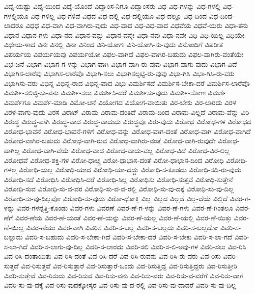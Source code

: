 {ವಿದ್ಯೆ-ಯಷ್ಟು
ವಿದ್ಯೆ-ಯಿಂದ
ವಿದ್ಯೆ-ಯೊಂದೆ
ವಿದ್ವಾಂಸ-ನಿಗೂ
ವಿದ್ವಾಂಸರು
ವಿಧ
ವಿಧ-ಗಳನ್ನು
ವಿಧ-ಗಳಲ್ಲಿ
ವಿಧ-ಗಳಲ್ಲಿಯೂ
ವಿಧ-ಗಳಿಲ್ಲ
ವಿಧ-ಗಳಿವೆ
ವಿಧದ
ವಿಧ-ದಲ್ಲಿ
ವಿಧ-ದಲ್ಲಿಯೂ
ವಿಧ-ದಲ್ಲೂ
ವಿಧ-ದಿಂದ
ವಿಧ-ದಿಂದ-ಲಾದರೂ
ವಿಧಧ
ವಿಧ-ವಾಗಿ
ವಿಧ-ವಾಗಿರು-ವುದು
ವಿಧ-ವಾದ
ವಿಧ-ವಿಧ-ವಾದ
ವಿಧವೆಯ
ವಿಧವೆ-ಯರು
ವಿಧಾ-ತನು
ವಿಧಾನ
ವಿಧಾನ-ಗಳು
ವಿಧಾ-ನದ
ವಿಧಾನ-ವನ್ನು
ವಿಧಾನ-ವನ್ನೇ
ವಿಧಾ-ನವು
ವಿಧಾ-ನವೇ
ವಿಧಿ
ವಿಧಿ-ಯಿಲ್ಲ
ವಿಧಿಯೇ
ವಿಧೇಯ-ಳಾದ
ವಿನಃ
ವಿನಲ್ಲಿ
ವಿನಾ
ವಿನಿಂದ
ವಿನಿ-ಯೋಗಃ
ವಿನಿ-ಯೋಗಿ-ಸು-ವುದು
ವಿನೊಂದಿಗೆ
ವಿಪರೀತ
ವಿಪರ್ಯಯ
ವಿಪರ್ಯಯವು
ವಿಪರ್ಯಯೋ
ವಿಫಲ-ವಾಗಿದೆ
ವಿಫಲ-ವಾಗಿರ-ಬಹುದು
ವಿಫಲ-ವಾಗಿರು-ವಂತೆಯೇ
ವಿಭ-ಜನೆ
ವಿಭಾಗ
ವಿಭಾಗ-ಗ-ಳನ್ನು
ವಿಭಾಗ-ವಾಗಿ
ವಿಭಾಗ-ವಾಗಿ-ರು-ವುವು
ವಿಭಾಗ-ವಾಗು-ವುದು
ವಿಭಾಗ-ವಿದೆ
ವಿಭಾಗಿಸ-ಲಾರೆವು
ವಿಭಾಗಿಸ-ಲಾರೆವೊ
ವಿಭಾಗಿ-ಸಲು
ವಿಭಾಗಿಸಲ್ಪಟ್ಟಿ-ರು-ವುವು
ವಿಭಾ-ಗಿಸಿ
ವಿಭಾ-ಗಿಸಿ-ರು-ವರು
ವಿಭಾಗಿಸು-ವರು
ವಿಭಿನ್ನ
ವಿಭಿನ್ನ-ರಾದ
ವಿಭಿನ್ನ-ವಾದ
ವಿಭು
ವಿಮರ್ಶಿಸದೆ
ವಿಮರ್ಶಿಸ-ಬೇಕಾ-ದರೆ
ವಿಮರ್ಶಿಸ-ಲಾರೆವೊ
ವಿಮರ್ಶಿ-ಸಲಿಚ್ಛಿ-ಸು-ವನು
ವಿಮರ್ಶಿ-ಸಲು
ವಿಮರ್ಶಿಸಿ-ದರೆ
ವಿಮರ್ಶಿಸು-ವುದು
ವಿಮರ್ಶಿ-ಸೋಣ
ವಿಮರ್ಶೆ
ವಿಮರ್ಶೆಗೂ
ವಿಮರ್ಶೆ-ಮಾಡಿ
ವಿಮೋ-ಚನೆ
ವಿಯೋಗದ
ವಿಯೋಗ-ವಾಯಿತು
ವಿರ-ಬೇಕು
ವಿರ-ಲಾರದು
ವಿರಳ
ವಿರಳ-ವಾಗು-ವುದು
ವಿರಸ
ವಿರಾಟ್
ವಿರಾಮ
ವಿರಾಮ-ದಂತಿದೆ
ವಿರಾಮ-ದಿಂದ
ವಿರಾಮ-ವಿಲ್ಲದೆ
ವಿರಾಮ-ವೆನ್ನು
ವಿರಿ
ವಿರುದ್ಧ
ವಿರುದ್ಧ-ವಾಗಿ
ವಿರುದ್ಧ-ವಾದ
ವಿರುದ್ಧ-ವಾದುದು
ವಿರುದ್ಧವೂ
ವಿರು-ವುದು
ವಿರೋಧ
ವಿರೋಧ-ಗಳ
ವಿರೋಧದ
ವಿರೋಧ-ಭಾವನೆ
ವಿರೋಧ-ಭಾವನೆ-ಗಳಿಗೆ
ವಿರೋಧ-ವನ್ನು
ವಿರೋಧ-ವಾಗ-ದಂತೆ
ವಿರೋಧ-ವಾಗಿ
ವಿರೋಧ-ವಾಗಿದೆ
ವಿರೋಧ-ವಾಗಿರ-ಬಹುದು
ವಿರೋಧ-ವಾಗಿ-ರುವ
ವಿರೋಧ-ವಾಗಿರು-ವಂತೆ
ವಿರೋಧ-ವಾಗಿ-ರುವುದೇ
ವಿರೋಧ-ವಾಗಿಲ್ಲ
ವಿರೋಧ-ವಾಗಿ-ವೆಯೆ
ವಿರೋಧ-ವಾದ
ವಿರೋಧ-ವಾದು-ವಲ್ಲ
ವಿರೋಧ-ವಿದೆ
ವಿರೋಧ-ವಿರ-ಲಿಲ್ಲ
ವಿರೋಧವೆ
ವಿರೋಧ-ಶಕ್ತಿ-ಗಳ
ವಿರೋ-ಧಾಚ್ಚ
ವಿರೋ-ಧಾಭಾಸ-ದಂತೆ
ವಿರೋ-ಧಾಭಾಸ-ದಿಂದ
ವಿರೋಧಿ
ವಿರೋಧಿ-ಗಳಲ್ಲ
ವಿರೋಧಿ-ಯಲ್ಲ
ವಿರೋಧಿ-ಯಾದ
ವಿರೋಧಿ-ಯಾ-ದದ್ದು
ವಿರೋಧಿ-ಸ-ಕೂಡದು
ವಿರೋಧಿ-ಸದಿ-ರು-ವುದು
ವಿರೋಧಿ-ಸದೆ
ವಿರೋಧಿಸಿ
ವಿರೋಧಿಸಿ-ದರೆ
ವಿರೋಧಿ-ಸಿಲ್ಲ
ವಿರೋಧಿಸು
ವಿರೋಧಿ-ಸುತ್ತವೆ
ವಿರೋಧಿ-ಸುತ್ತೇನೆ
ವಿರೋಧಿ-ಸುವ
ವಿರೋಧಿ-ಸು-ವ-ವರ
ವಿರೋಧಿ-ಸು-ವ-ವ-ರಲ್ಲಿ
ವಿರೋಧಿ-ಸು-ವು-ದಕ್ಕೆ
ವಿರೋಧಿ-ಸು-ವು-ದಿಲ್ಲ
ವಿರೋಧಿ-ಸು-ವು-ದಿಲ್ಲವೋ
ವಿರೋಧಿ-ಸು-ವುದು
ವಿರೋ-ಧೋಕ್ತಿ
ವಿಲ್ಲ
ವಿಲ್ಲದ
ವಿಲ್ಲದೆ
ವಿಲ್ಲ-ದೆಯೆ
ವಿಲ್ಲಿದೆ
ವಿವರ-ಗ-ಳನ್ನು
ವಿವರ-ಗಳನ್ನೆತ್ತಿ-ಕೊಂಡು
ವಿವರ-ಗಳು
ವಿವರಣೆ
ವಿವರ-ಣೆ-ಗ-ಳನ್ನು
ವಿವರ-ಣೆ-ಗಳು
ವಿವರ-ಣೆ-ಗಿಂತಲೂ
ವಿವರ-ಣೆಗೆ
ವಿವರ-ಣೆಯ
ವಿವರ-ಣೆ-ಯಂತೆ
ವಿವರ-ಣೆ-ಯನ್ನು
ವಿವರ-ಣೆ-ಯಲ್ಲ
ವಿವರ-ಣೆ-ಯಲ್ಲಿ
ವಿವರ-ಣೆ-ಯಿತ್ತು
ವಿವರ-ಣೆ-ಯಿಲ್ಲ
ವಿವರ-ಣೆಯು
ವಿವರ-ವಾಗಿ
ವಿವರಿಸ
ವಿವರಿ-ಸ-ಬಲ್ಲ
ವಿವರಿ-ಸ-ಬಲ್ಲದು
ವಿವರಿ-ಸ-ಬಲ್ಲದೋ
ವಿವರಿ-ಸ-ಬಲ್ಲುದು
ವಿವರಿ-ಸ-ಬಹುದು
ವಿವರಿ-ಸ-ಬೇಕಾ-ಗಿದೆ
ವಿವರಿ-ಸ-ಬೇಕಾ-ದರೆ
ವಿವರಿ-ಸ-ಬೇಕು
ವಿವರಿ-ಸ-ಲಾ-ಗದೆ
ವಿವರಿ-ಸ-ಲಾ-ಗಿದೆ
ವಿವರಿ-ಸ-ಲಾಗು-ವು-ದಿಲ್ಲ
ವಿವರಿ-ಸ-ಲಾರದು
ವಿವರಿ-ಸಲಿ
ವಿವರಿ-ಸ-ಲಿ-ಅವು-ಗಳ
ವಿವರಿ-ಸಲು
ವಿವ-ರಿಸಿ
ವಿವ-ರಿಸಿ-ದಂತಾಯಿತು
ವಿವ-ರಿಸಿ-ದಂತೆ
ವಿವ-ರಿಸಿ-ದರೆ
ವಿವ-ರಿಸಿ-ರುವನು
ವಿವ-ರಿಸಿ-ರು-ವರು
ವಿವ-ರಿಸು
ವಿವರಿ-ಸುತ್ತದೆ
ವಿವ-ರಿಸುತ್ತವೆ
ವಿವ-ರಿಸುತ್ತಾರೆ
ವಿವ-ರಿಸುತ್ತಾರೆ-ಒಂದು
ವಿವ-ರಿಸುತ್ತಿದ್ದ
ವಿವ-ರಿಸುತ್ತಿದ್ದರು
ವಿವ-ರಿಸುತ್ತೀರಿ
ವಿವರಿ-ಸುತ್ತೇವೆ
ವಿವ-ರಿಸುದು
ವಿವ-ರಿಸುವ
ವಿವ-ರಿಸು-ವನು
ವಿವ-ರಿಸು-ವರು
ವಿವ-ರಿಸು-ವ-ವರೆಗೆ
ವಿವ-ರಿಸು-ವಾಗ
ವಿವರಿ-ಸು-ವು-ದಕ್ಕೆ
ವಿವ-ರಿಸು-ವುದಕ್ಕೋಸ್ಕರ
ವಿವ-ರಿಸು-ವು-ದ-ರಲ್ಲಿ
ವಿವ-ರಿಸು-ವು-ದಾದರೆ
ವಿವರಿ-ಸು-ವು-ದಿಲ್ಲ
}
